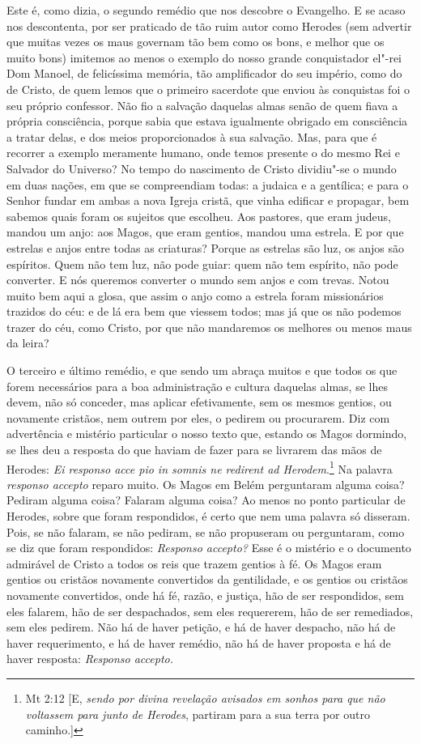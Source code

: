 Este é, como dizia, o segundo remédio que nos descobre o Evangelho. E se
acaso nos descontenta, por ser praticado de tão ruim autor como Herodes
(sem advertir que muitas vezes os maus governam tão bem como os bons,
e melhor que os muito bons) imitemos ao menos o exemplo do nosso
grande conquistador el"-rei Dom Manoel, de felicíssima memória, tão
amplificador do seu império, como do de Cristo, de quem lemos que o
primeiro sacerdote que enviou às conquistas foi o seu próprio confessor.
Não fio a salvação daquelas almas senão de quem fiava a própria
consciência, porque sabia que estava igualmente obrigado em consciência
a tratar delas, e dos meios proporcionados à sua salvação. Mas, para que
é recorrer a exemplo meramente humano, onde temos presente o do mesmo
Rei e Salvador do Universo? No tempo do nascimento de Cristo dividiu"-se
o mundo em duas nações, em que se compreendiam todas: a judaica e a
gentílica; e para o Senhor fundar em ambas a nova Igreja cristã, que
vinha edificar e propagar, bem sabemos quais foram os sujeitos que
escolheu. Aos pastores, que eram judeus, mandou um anjo: aos Magos, que
eram gentios, mandou uma estrela. E por que estrelas e anjos entre todas
as criaturas? Porque as estrelas são luz, os anjos são espíritos. Quem
não tem luz, não pode guiar: quem não tem espírito, não pode converter.
E nós queremos converter o mundo sem anjos e com trevas. Notou muito bem
aqui a glosa, que assim o anjo como a estrela foram missionários
trazidos do céu: e de lá era bem que viessem todos; mas já que os não
podemos trazer do céu, como Cristo, por que não mandaremos os melhores
ou menos maus da leira?

O terceiro e último remédio, e que sendo um abraça muitos e que todos os
que forem necessários para a boa administração e cultura daquelas almas,
se lhes devem, não só conceder, mas aplicar efetivamente, sem os mesmos
gentios, ou novamente cristãos, nem outrem por eles, o pedirem ou
procurarem. Diz com advertência e mistério particular o nosso texto que,
estando os Magos dormindo, se lhes deu a resposta do que haviam de fazer
para se livrarem das mãos de Herodes: \emph{Ei responso acce pio in
somnis ne redirent ad Herodem}.\footnote{Mt 2:12 [E, \emph{sendo por divina revelação avisados em sonhos para que não voltassem para junto de
Herodes}, partiram para a sua terra por outro caminho.]} Na palavra \emph{responso
accepto} reparo muito. Os Magos em Belém perguntaram alguma coisa?
Pediram alguma coisa? Falaram alguma coisa? Ao menos no ponto particular
de Herodes, sobre que foram respondidos, é certo que nem uma palavra só
disseram. Pois, se não falaram, se não pediram, se não propuseram ou
perguntaram, como se diz que foram respondidos: \emph{Responso accepto?}
Esse é o mistério e o documento admirável de Cristo a todos os reis que
trazem gentios à fé. Os Magos eram gentios ou cristãos novamente
convertidos da gentilidade, e os gentios ou cristãos novamente
convertidos, onde há fé, razão, e justiça, hão de ser respondidos, sem
eles falarem, hão de ser despachados, sem eles requererem, hão de ser
remediados, sem eles pedirem. Não há de haver petição, e há de haver
despacho, não há de haver requerimento, e há de haver remédio, não há de
haver proposta e há de haver resposta: \emph{Responso accepto.}

